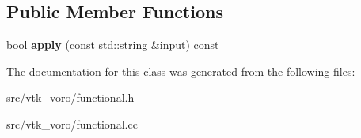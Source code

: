\subsection*{Public Member Functions}
\begin{DoxyCompactItemize}
\item 
bool {\bfseries apply} (const std\+::string \&input) const \hypertarget{classtools_1_1Predicates_1_1IS__NOT__EMPTY__STRING_a46639c0de1292ef286576ab64e0c68f3}{}\label{classtools_1_1Predicates_1_1IS__NOT__EMPTY__STRING_a46639c0de1292ef286576ab64e0c68f3}

\end{DoxyCompactItemize}


The documentation for this class was generated from the following files\+:\begin{DoxyCompactItemize}
\item 
src/vtk\+\_\+voro/functional.\+h\item 
src/vtk\+\_\+voro/functional.\+cc\end{DoxyCompactItemize}
